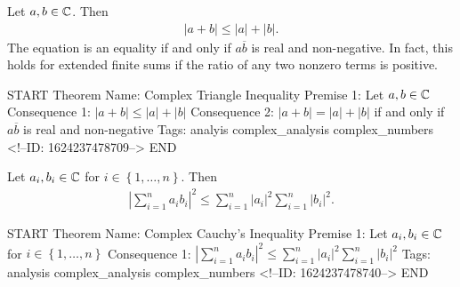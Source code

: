\documentclass{memoir}
\begin{document}
\begin{thm}
Let \(a,b \in \mathbb{C}\). Then
\begin{align*}
	\left| a + b \right| \leq \left| a \right| + \left| b \right|.
\end{align*}
The equation is an equality if and only if \(a \overline{b}\) is real and non-negative. In fact, this holds for extended finite sums if the ratio of any two nonzero terms is positive.
\end{thm}

\begin{anki}
START
Theorem
Name: Complex Triangle Inequality
Premise 1: Let \(a,b \in \mathbb{C}\)
Consequence 1: \(\left| a+b \right| \leq \left| a \right| + \left| b \right| \) 
Consequence 2: \(\left| a+b \right| = \left| a \right| + \left| b \right| \) if and only if \(a \overline{b}\) is real and non-negative
Tags: analyis complex_analysis complex_numbers
<!--ID: 1624237478709-->
END
\end{anki}

\begin{thm}
	Let \(a_i,b_i \in \mathbb{C}\) for \(i \in \left\{ 1,\ldots,n \right\} \). Then
	\begin{align*}
		\left| \sum_{i=1}^{n} a_ib_i \right|^2 \leq \sum_{i=1}^{n} \left| a_i \right|^2 \sum_{i=1}^{n} \left| b_i \right|^2.
	\end{align*}
\end{thm}

\begin{anki}
START
Theorem
Name: Complex Cauchy's Inequality
Premise 1: Let \(a_i, b_i \in \mathbb{C}\) for \(i \in \left\{ 1,\ldots,n \right\} \)
Consequence 1: \(\left| \sum_{i=1}^{n} a_ib_i \right|^2 \leq \sum_{i=1}^{n} \left| a_i \right|^2 \sum_{i=1}^{n} \left| b_i \right|^2\)
Tags: analysis complex_analysis complex_numbers
<!--ID: 1624237478740-->
END
\end{anki}
\end{document}

